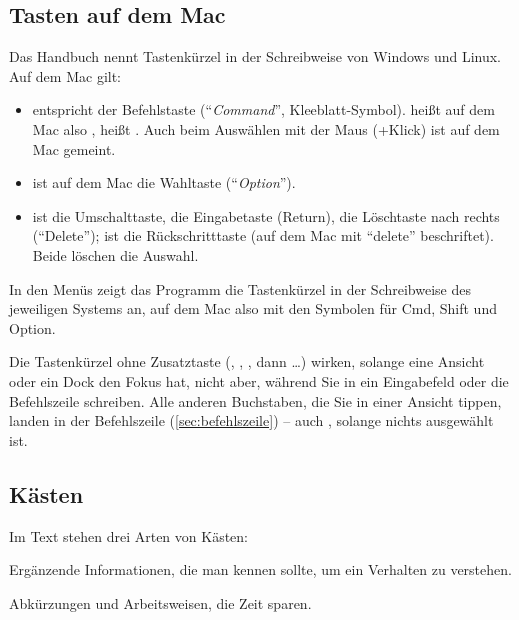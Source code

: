 \subsection*{Tasten auf dem Mac}

Das Handbuch nennt Tastenkürzel in der Schreibweise von Windows und Linux. Auf dem Mac gilt:

\begin{itemize}
  \item {} entspricht der Befehlstaste  (\enquote{\textit{Command}},
    Kleeblatt-Symbol).  heißt auf dem Mac also , 
    heißt . Auch beim Auswählen mit der Maus (+Klick) ist auf dem
    Mac  gemeint.
  \item {} ist auf dem Mac die Wahltaste (\enquote{\textit{Option}}).
  \item {} ist die Umschalttaste,  die Eingabetaste (Return),
     die Löschtaste nach rechts (\enquote{Delete});  ist die
    Rückschritttaste (auf dem Mac mit \enquote{delete} beschriftet). Beide löschen die
    Auswahl.
\end{itemize}

In den Menüs zeigt das Programm die Tastenkürzel in der Schreibweise des jeweiligen Systems
an, auf dem Mac also mit den Symbolen für Cmd, Shift und Option.

\begin{tipp}
Die Tastenkürzel ohne Zusatztaste (, , , dann  \dots)
wirken, solange eine Ansicht oder ein Dock den Fokus hat, nicht aber, während Sie in ein
Eingabefeld oder die Befehlszeile schreiben. Alle anderen Buchstaben, die Sie in einer Ansicht
tippen, landen in der Befehlszeile (\autoref{sec:befehlszeile}) -- auch , solange nichts
ausgewählt ist.
\end{tipp}

\subsection*{Kästen}

Im Text stehen drei Arten von Kästen:

\begin{hinweis}
Ergänzende Informationen, die man kennen sollte, um ein Verhalten zu verstehen.
\end{hinweis}

\begin{tipp}
Abkürzungen und Arbeitsweisen, die Zeit sparen.
\end{tipp}

